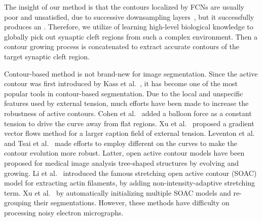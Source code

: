 


The insight of our method is that the contours localized by FCNs are usually poor and unsatisfied, due to successive downsampling layers~\cite{Chen2017}, but it successfully produces an .
%
Therefore, we utilize  of learning high-level biological knowledge to globally pick out synaptic cleft regions from such a complex environment.
%
Then a contour growing process is concatenated to extract accurate contours of the target synaptic cleft region.
%

Contour-based method is not brand-new for image segmentation.
Since the active contour was first introduced by Kass et al.~\cite{Kass1988}, it has become one of the most popular tools in contour-based segmentation.
Due to the local and unspecific features used by external tension, much efforts have been made to increase the robustness of active contours.
Cohen et al.~\cite{Cohen1991} added a balloon force as a constant tension to drive the curve away from flat regions.
Xu et al.~\cite{Xu1998} proposed a gradient vector flows method for a larger caption field of external tension.
Leventon et al.~\cite{Leventon2003Statistical} and Tsai et al.~\cite{Tsai2003A} made efforts to employ different  on the curves to make the contour evolution more robust.
Latter, open active contour models have been proposed for medical image analysis  tree-shaped structures \cite{Li2009Actin,Xu2013EXTRACTION} by evolving and growing.
Li et al.~\cite{Li2009Actin} introduced the famous stretching open active contour (SOAC) model for extracting actin filaments, by adding non-intensity-adaptive stretching term.
Xu et al.~\cite{Xu2013EXTRACTION}  by automatically initializing multiple SOAC models and re-grouping their segmentations.
However, these methods have difficulty on processing noisy electron micrographs.

